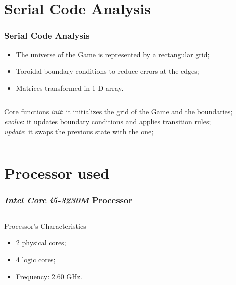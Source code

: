 \documentclass{beamer}
\begin{document}
\section{Serial Code Analysis}
\begin{frame}
	\frametitle{Serial Code Analysis}
	\begin{itemize}
		\item The universe of the Game is represented by a rectangular grid;
		\item Toroidal boundary conditions to reduce errors at the edges;
		\item Matrices transformed in 1-D array.
	\end{itemize}
	\vfill
	\begin{columns}
		\begin{block}{Core functions}
			\textit{init}: it initializes the grid of the Game and the boundaries;\\[0.15 cm]
			\textit{evolve}: it updates boundary conditions and applies transition rules;\\[0.15 cm]
			\textit{update}: it swaps the previous state with the one;
		\end{block}
	\end{columns}
\end{frame}

\section{Processor used}
\begin{frame}
	\frametitle{\emph{Intel Core i5-3230M} Processor}
	\begin{columns}
		\column{0.7\textwidth}
		\begin{block}{Processor's Characteristics}
			\begin{itemize}
				\item 2 physical cores;
				\item 4 logic cores;
				\item Frequency: 2.60 GHz.
			\end{itemize}
		\end{block}
	\end{columns}
\end{frame}
\end{document}
